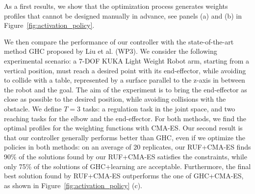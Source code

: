 As a first results, we show that the optimization process  generates weights
profiles that cannot be designed manually in advance, see panels (a) and (b) in 
Figure~\ref{fig:activation_policy}.


We then compare the performance of our controller with the state-of-the-art
method GHC proposed by Liu et al. \cite{liu_ICRA2015} (WP3). We consider the
following experimental scenario: a 7-DOF KUKA Light Weight Robot arm, starting
from a vertical position, must reach a desired point with its end-effector,
while avoiding to collide with a table, represented by a surface parallel to the
z-axis in between the robot and the goal. The aim of the experiment is to bring
the end-effector as close as possible to the desired position, while avoiding
collisions with the obstacle. We define  $T=3$ tasks: a regulation task in the
joint space, and two reaching tasks for the elbow and the end-effector. For both
methods, we find the optimal profiles for the weighting functions with CMA-ES.
Our second result is that our controller generally performs better than GHC,
even if we optimize the policies in both methods: on an average of 20
replicates, our RUF+CMA-ES finds 90\% of the solutions found by our RUF+CMA-ES
satisfies the constraints, while only 75\% of the solutions of GHC+learning are
acceptable. Furthermore, the final best solution found by RUF+CMA-ES outperforms
the one of GHC+CMA-ES, as shown in Figure~\ref{fig:activation_policy} (c).

